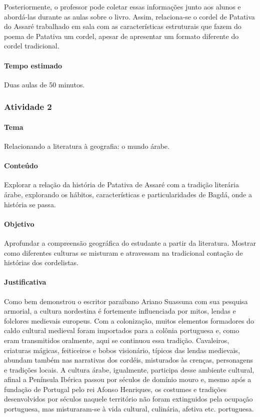 \documentclass[11pt]{extarticle}
\begin{document}
Posteriormente, o professor pode coletar essas informações junto aos alunos e abordá-las durante as aulas sobre o livro. Assim, relaciona-se o cordel de Patativa do Assaré trabalhado em sala com as características estruturais que fazem do poema de Patativa um cordel, apesar de apresentar um formato diferente do cordel tradicional.



\paragraph{Tempo estimado} Duas aulas de 50 minutos.


\subsubsection{Atividade 2}


\paragraph{Tema} Relacionando a literatura à geografia: o mundo árabe.

\paragraph{Conteúdo} Explorar a relação da história de Patativa de Assaré com a tradição literária árabe, explorando os hábitos, características e particularidades de Bagdá, onde a história se passa.

\paragraph{Objetivo} Aprofundar a compreensão geográfica do estudante a partir da literatura. Mostrar como diferentes culturas se misturam e atravessam na tradicional contação de histórias dos cordelistas. 

\paragraph{Justificativa} Como bem demonstrou o escritor paraibano Ariano Suassuna com sua pesquisa armorial, a cultura nordestina é fortemente influenciada por mitos, lendas e folclores medievais europeus. Com a colonização, muitos elementos formadores do caldo cultural medieval foram importados para a colônia portuguesa e, como eram transmitidos oralmente, aqui se continuou essa tradição. Cavaleiros, criaturas mágicas, feiticeiros e bobos visionário, típicos das lendas medievais, abundam também nas narrativas dos cordéis, misturados às crenças, personagens e tradições locais. A cultura árabe, igualmente, participa desse ambiente cultural, afinal a Península Ibérica passou por séculos de domínio mouro e, mesmo após a fundação de Portugal pelo rei Afonso Henriques, os costumes e tradições desenvolvidos por séculos naquele território não foram extinguidos pela ocupação portuguesa, mas misturaram-se à vida cultural, culinária, afetiva etc. portuguesa.
\end{document}

